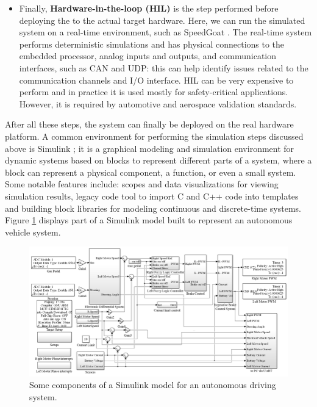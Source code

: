 \begin{itemize}
    \item Finally, \textbf{Hardware-in-the-loop (HIL)} is the step performed before deploying the \es to the actual target hardware. Here, we can run the simulated system on a real-time environment, such as SpeedGoat \cite{SpeedGoat}. The real-time system performs deterministic simulations and has physical connections to the embedded processor, \ie analog inputs and outputs, and communication interfaces, such as CAN and UDP: this can help identify issues related to the communication channels and I/O interface. HIL can be very expensive to perform and in practice it is used mostly for safety-critical applications. However, it is required by automotive and aerospace validation standards. 
\end{itemize}

\noindent After all these steps, the system can finally be deployed on the real hardware platform. A common environment for performing the simulation steps discussed above is Simulink \cite{Simulink}; it is a graphical modeling and simulation environment for dynamic systems based on blocks to represent different parts of a system, where a block can represent a physical component, a function, or even a small system. Some notable features include: scopes and data visualizations for viewing simulation results, legacy code tool to import C and C++ code into templates and building block libraries for modeling continuous and discrete-time systems.
Figure \ref{simulink_model} displays part of a Simulink model built to represent an autonomous vehicle system.

\begin{figure}[H]
    \centering
    \includegraphics[width=\linewidth]{figures/simulink_model.png}
    \caption{Some components of a Simulink model for an autonomous driving system.}
    \label{simulink_model}
\end{figure}


